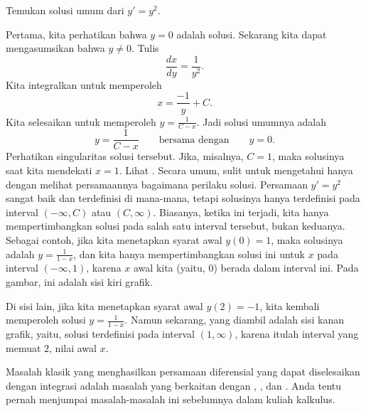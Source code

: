 \begin{example}
Temukan solusi umum dari
$y' = y^2$.

Pertama, kita perhatikan bahwa $y=0$ adalah solusi.  Sekarang kita dapat mengasumsikan bahwa $y \neq 0$.
Tulis
\begin{equation*}
\frac{dx}{dy} = \frac{1}{y^2} .
\end{equation*}
Kita integralkan untuk memperoleh
\begin{equation*}
x = \frac{-1}{y} + C .
\end{equation*}
Kita selesaikan untuk memperoleh $y = \frac{1}{C-x}$.
Jadi solusi umumnya adalah
\begin{equation*}
y = \frac{1}{C-x} \qquad \text{bersama dengan} \qquad y = 0.
\end{equation*}
Perhatikan singularitas solusi tersebut.  Jika, misalnya, $C=1$, maka
solusinya  saat kita mendekati $x=1$.  Lihat
.  Secara umum,
sulit untuk mengetahui
hanya dengan melihat persamaannya bagaimana perilaku solusi.
Persamaan $y' = y^2$ sangat baik dan terdefinisi di mana-mana, tetapi
solusinya hanya terdefinisi pada interval $(-\infty, C)$ atau
$(C, \infty)$.  Biasanya, ketika ini terjadi, kita hanya mempertimbangkan solusi
pada salah satu interval tersebut, bukan keduanya.
Sebagai contoh, jika kita menetapkan syarat awal $y(0) = 1$, maka
solusinya adalah $y=\frac{1}{1-x}$, dan kita hanya mempertimbangkan solusi ini
untuk $x$ pada interval $(-\infty,1)$, karena $x$ awal kita (yaitu,
$0$) berada dalam interval ini.
Pada gambar, ini adalah sisi kiri grafik.
\begin{myfig}
\capstart
{}
\caption{Plot $y=\frac{1}{1-x}$.\label{1over1mx:fig}}
\end{myfig}

Di sisi lain, jika kita menetapkan syarat awal $y(2)=-1$, kita kembali memperoleh
solusi $y=\frac{1}{1-x}$.  Namun sekarang, yang diambil adalah sisi kanan
grafik, yaitu, solusi terdefinisi pada interval $(1,\infty)$, karena
itulah interval yang memuat $2$, nilai awal $x$.
\end{example}

Masalah klasik yang menghasilkan persamaan diferensial yang dapat diselesaikan dengan integrasi
adalah masalah
yang berkaitan dengan ,
, dan .  Anda tentu pernah menjumpai
masalah-masalah ini sebelumnya dalam kuliah kalkulus.

